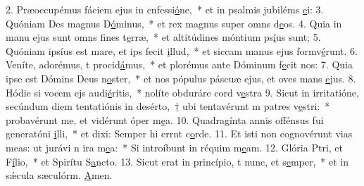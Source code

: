 2. Præoccupémus fáciem ejus in cnfessi\uline{ó}ne,~* et in psalmis jubiléms \uline{e}i:
3. Quóniam Des magnus D\uline{ó}minus,~* et rex magnus super omns d\uline{e}os.
4. Quia in manu ejus sunt omns fines t\uline{e}rræ,~* et altitúdines móntium ps\uline{í}us sunt;
5. Quóniam ipsíus est mare, et ips fecit \uline{i}llud,~* et siccam manus ejus formv\uline{é}runt.
6. Veníte, adorémus, t procid\uline{á}mus,~* et plorémus ante Dóminum  f\uline{e}cit nos:
7. Quia ipse est Dómins Deus n\uline{o}ster,~* et nos pópulus páscuæ ejus, et oves mans \uline{e}jus.
8. Hódie si vocem ejs audi\uline{é}ritis,~* nolíte obduráre cord v\uline{e}stra
9. Sicut in irritatióne, secúndum diem tentatiónis in desérto,~† ubi tentavérunt m patres v\uline{e}stri:~* probavérunt me, et vidérunt óper m\uline{e}a.
10. Quadragínta annis offénsus fui generatóni \uline{i}lli,~* et dixi: Semper hi errnt c\uline{o}rde.
11. Et isti non cognovérunt vias meas: ut jurávi n ira m\uline{e}a:~* Si introíbunt in réquim m\uline{e}am.
12. Glória Ptri, et F\uline{í}lio,~* et Spirítu S\uline{a}ncto.
13. Sicut erat in princípio, t nunc, et s\uline{e}mper,~* et in sǽcula sæculórm. \uline{A}men.
